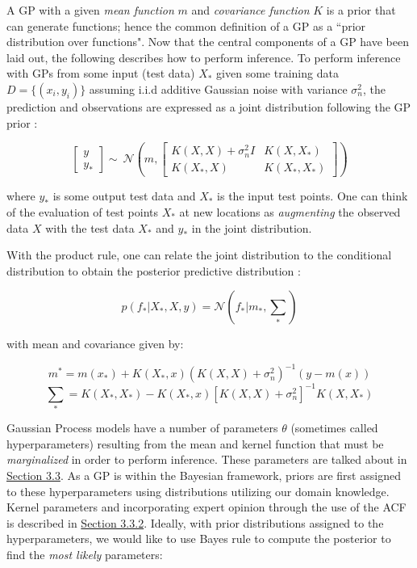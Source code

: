 A GP with a given \textit{mean function} $m$ and \textit{covariance function} $K$ is a prior that can generate functions; hence the common definition of a GP as a ``prior distribution over functions". Now that the central components of a GP have been laid out, the following describes how to perform inference. To perform inference with GPs from some input (test data) $X_*$ given some training data $D = \{(x_i, y_i)\}$ assuming i.i.d additive Gaussian noise with variance $\sigma_{n}^2$, the prediction and observations are expressed as a joint distribution following the GP prior \cite{roberts_gaussian_2013}:

\begin{equation}
\begin{bmatrix} 
y \\ 
y_*
\end{bmatrix} 
\sim{~} \mathcal{N} (m, \begin{bmatrix} 
K(X, X) + \sigma_{n}^2I & K(X, X_*) \\
K(X_*, X) & K(X_*, X_*)
\end{bmatrix})
\end{equation}

where $y_*$ is some output test data and $X_*$ is the input test points. One can think of the evaluation of test points $X_*$ at new locations as \textit{augmenting} the observed data $X$ with the test data $X_*$ and $y_*$ in the joint distribution. 

With the product rule, one can relate the joint distribution to the conditional distribution to obtain the posterior predictive distribution \cite{pml1Book}:

\begin{equation}
p(f_* | X_*, X, y) = \mathcal{N}(f_* | m_*, \sum_*)
\end{equation}

with mean and covariance given by:

\begin{equation}
m^* = m(x_*) + K(X_*, x)(K(X, X) + \sigma_{n}^2)^{-1}(y - m(x))
\end{equation}
\begin{equation}
\sum_{*} = K(X_*, X_*) - K(X_*, x)[K(X, X) + \sigma_{n}^2]^{-1}K(X, X_*)
\end{equation}

Gaussian Process models have a number of parameters $\theta$ (sometimes called hyperparameters) resulting from the mean and kernel function that must be \textit{marginalized} in order to perform inference. These parameters are talked about in \hyperlink{section.3.3}{Section 3.3}. As a GP is within the Bayesian framework, priors are first assigned to these hyperparameters using distributions utilizing our domain knowledge. Kernel parameters and incorporating expert opinion through the use of the \ac{ACF} is described in \hyperlink{subsubsection.3.3.2}{Section 3.3.2}. Ideally, with prior distributions assigned to the hyperparameters, we would like to use Bayes rule to compute the posterior to find the \textit{most likely} parameters:

